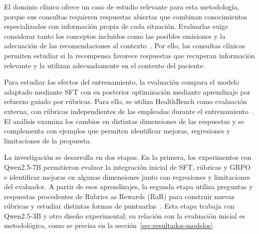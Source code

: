 El dominio clínico ofrece un caso de estudio relevante para esta metodología, porque sus consultas requieren respuestas abiertas que combinan conocimientos especializados con información propia de cada situación. Evaluarlas exige considerar tanto los conceptos incluidos como las posibles omisiones y la adecuación de las recomendaciones al contexto~\cite{arora2025healthbench}. Por ello, las consultas clínicas permiten estudiar si la recompensa favorece respuestas que recuperan información relevante y la utilizan adecuadamente en el contexto del paciente.

Para estudiar los efectos del entrenamiento, la evaluación compara el modelo adaptado mediante SFT con su posterior optimización mediante aprendizaje por refuerzo guiado por rúbricas. Para ello, se utiliza HealthBench como evaluación externa, con rúbricas independientes de las empleadas durante el entrenamiento~\cite{arora2025healthbench}. El análisis examina los cambios en distintas dimensiones de las respuestas y se complementa con ejemplos que permiten identificar mejoras, regresiones y limitaciones de la propuesta.


La investigación se desarrolla en dos etapas. En la primera, los experimentos con Qwen2.5-7B permitieron evaluar la integración inicial de SFT, rúbricas y GRPO e identificar mejoras en algunas dimensiones junto con regresiones y limitaciones del evaluador. A partir de esos aprendizajes, la segunda etapa utiliza preguntas y respuestas procedentes de Rubrics as Rewards (RaR) para construir nuevas rúbricas y estudiar distintas formas de puntuarlas~\cite{gunjal2025rar}. Esta etapa trabaja con Qwen2.5-3B y otro diseño experimental; su relación con la evaluación inicial es metodológica, como se precisa en la sección~\ref{sec:resultados-modelos}.
